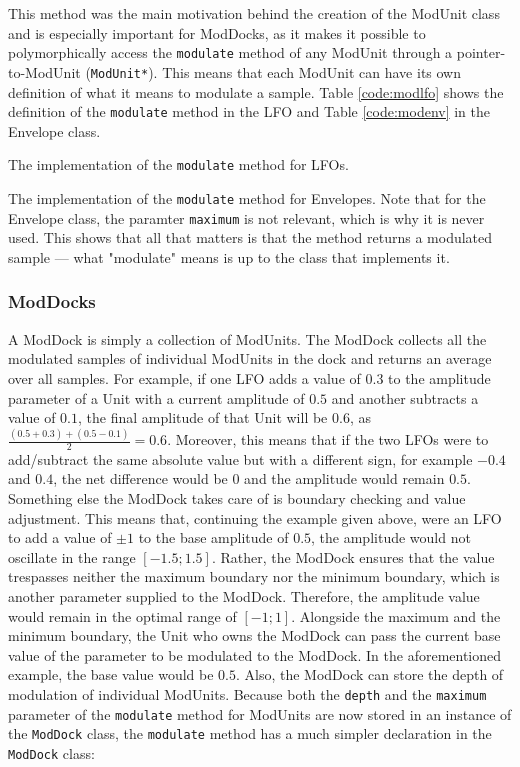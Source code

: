 \documentclass[12pt,twoside]{report}
\begin{document}
\noindent This method was the main motivation behind the creation of the ModUnit class and is especially important for ModDocks, as it makes it possible to polymorphically access the \texttt{modulate} method of any ModUnit through a pointer-to-ModUnit (\texttt{ModUnit*}). This means that each ModUnit can have its own definition of what it means to modulate a sample. Table \ref{code:modlfo} shows the definition of the \texttt{modulate} method in the LFO and Table \ref{code:modenv} in the Envelope class.

\begin{table}[ht!]
  \caption{The implementation of the \texttt{modulate} method for LFOs.}
  \label{code:modlfo}
\end{table}

\begin{table}
  \caption{The implementation of the \texttt{modulate} method for Envelopes. Note that for the Envelope class, the paramter \texttt{maximum} is not relevant, which is why it is never used. This shows that all that matters is that the method returns a modulated sample --- what "modulate" means is up to the class that implements it.}
  \label{code:modenv}
\end{table}

\subsubsection{ModDocks}

A ModDock is simply a collection of ModUnits. The ModDock collects all the modulated samples of individual ModUnits in the dock and returns an average over all samples. For example, if one LFO adds a value of $0.3$ to the amplitude parameter of a Unit with a current amplitude of $0.5$ and another subtracts a value of $0.1$, the final amplitude of that Unit will be $0.6$, as $\frac{(0.5 + 0.3) + (0.5 - 0.1)}{2} = 0.6$. Moreover, this means that if the two LFOs were to add/subtract the same absolute value but with a different sign, for example $-0.4$ and $0.4$, the net difference would be $0$ and the amplitude would remain $0.5$. Something else the ModDock takes care of is boundary checking and value adjustment. This means that, continuing the example given above, were an LFO to add a value of $±1$ to the base amplitude of $0.5$, the amplitude would not oscillate in the range $[-1.5;1.5]$. Rather, the ModDock ensures that the value trespasses neither the maximum boundary nor the minimum boundary, which is another parameter supplied to the ModDock. Therefore, the amplitude value would remain in the optimal range of $[-1;1]$. Alongside the maximum and the minimum boundary, the Unit who owns the ModDock can pass the current base value of the parameter to be modulated to the ModDock. In the aforementioned example, the base value would be $0.5$. Also, the ModDock can store the depth of modulation of individual ModUnits. Because both the \texttt{depth} and the \texttt{maximum} parameter of the \texttt{modulate} method for ModUnits are now stored in an instance of the \texttt{ModDock} class, the \texttt{modulate} method has a much simpler declaration in the \texttt{ModDock} class:
\end{document}
